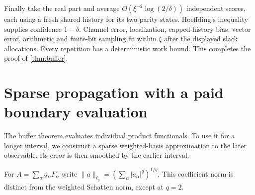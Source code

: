\documentclass[11pt,reqno]{amsart}
\numberwithin{equation}{section}
\theoremstyle{definition}
\theoremstyle{remark}
\newcommand{\nn}[1]{\lVert#1\rVert}
\begin{document}
Finally take the real part and average $O(\xi^{-2}\log(2/\delta))$ independent scores, each using a fresh shared history for its two parity states. Hoeffding's inequality supplies confidence $1-\delta$. Channel error, localization, capped-history bias, vector error, arithmetic and finite-bit sampling fit within $\xi$ after the displayed slack allocations. Every repetition has a deterministic work bound. This completes the proof of \cref{thm:buffer}.


\section{Sparse propagation with a paid boundary evaluation}\label{sec:sparse}

The buffer theorem evaluates individual product functionals. To use it for a longer interval, we construct a sparse weighted-basis approximation to the later observable. Its error is then smoothed by the earlier interval.

For $A=\sum_\alpha a_\alpha F_\alpha$ write
$\nn a_{\ell_q}=(\sum_\alpha|a_\alpha|^q)^{1/q}$.
This coefficient norm is distinct from the weighted Schatten norm, except at $q=2$.
\end{document}
